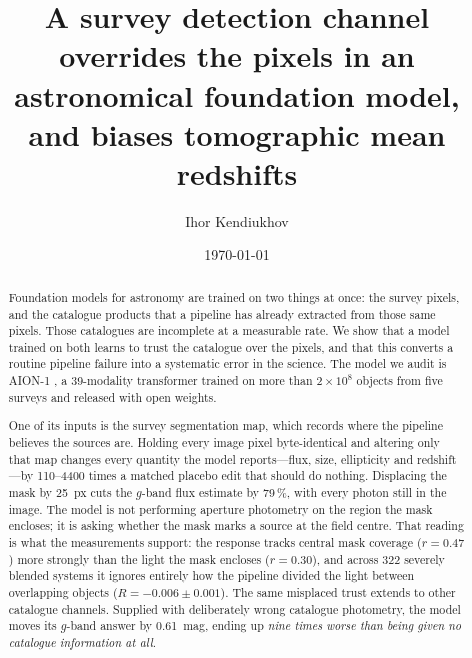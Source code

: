 \documentclass[11pt]{article}
\title{\bfseries A survey detection channel overrides the pixels in an astronomical
foundation model,\\ and biases tomographic mean redshifts}
\author[1]{Ihor Kendiukhov}
\affil[1]{Institute of Medical Genetics and Applied Genomics, University of T\"ubingen,
T\"ubingen, Germany}
\date{\today}
\newcommand{\aion}{AION-1}
\begin{document}
\maketitle

\begin{abstract}
\noindent
Foundation models for astronomy are trained on two things at once: the survey pixels, and the
catalogue products that a pipeline has already extracted from those same pixels. Those
catalogues are incomplete at a measurable rate. We show that a model trained on both learns to
trust the catalogue over the pixels, and that this converts a routine pipeline failure into a
systematic error in the science. The model we audit is \aion{} \citep{parker2025aion}, a
39-modality transformer trained on more than $2\times10^{8}$ objects from five surveys and
released with open weights.

One of its inputs is the survey segmentation map, which records where the pipeline believes the
sources are. Holding every image pixel byte-identical and altering only that map changes every
quantity the model reports---flux, size, ellipticity and redshift---by 110--4400 times a matched
placebo edit that should do nothing. Displacing the mask by \SI{25}{px} cuts the $g$-band flux
estimate by 79\,\%, with every photon still in the image. The model is not performing aperture
photometry on the region the mask encloses; it is asking whether the mask marks a source at the
field centre. That reading is what the measurements support: the response tracks central mask
coverage ($r=0.47$) more strongly than the light the mask encloses ($r=0.30$), and across 322
severely blended systems it ignores entirely how the pipeline divided the light between
overlapping objects ($R=-0.006\pm0.001$). The same misplaced trust extends to other catalogue
channels. Supplied with deliberately wrong catalogue photometry, the model moves its $g$-band
answer by \SI{0.61}{mag}, ending up \emph{nine times worse than being given no catalogue
information at all}.


\end{abstract}
\end{document}
